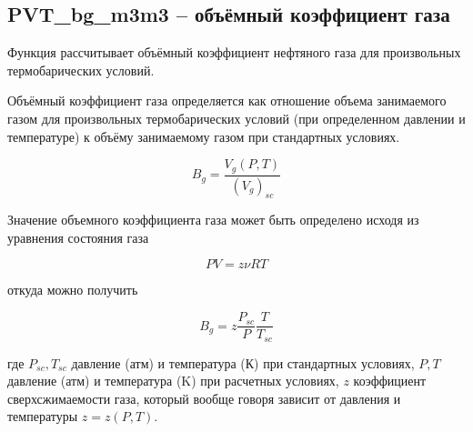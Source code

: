 \subsection{PVT\_bg\_m3m3 – объёмный коэффициент газа}
Функция рассчитывает объёмный коэффициент нефтяного газа для произвольных термобарических условий. 

Объёмный коэффициент газа определяется как отношение объема занимаемого газом для произвольных термобарических условий (при определенном давлении и температуре) к объёму занимаемому газом при стандартных условиях. 

$$B_g = \frac{V_g(P,T)}{(V_g)_{sc}}$$

Значение объемного коэффициента газа может быть определено исходя из уравнения состояния газа

$$ PV = z \nu RT  $$

откуда можно получить 

$$ B_g = z \frac{P_{sc}}{P} \frac{T}{T_{sc}} $$

где $P_{sc}, T_{sc}$ давление (атм) и температура (К) при стандартных условиях, $P,T$ давление (атм) и температура (K) при расчетных условиях, $z$ коэффициент сверхсжимаемости газа, который вообще говоря зависит от давления и температуры $z = z(P,T)$. 


\newcommand{\DataFile}{data/Bg_P_data.txt}

